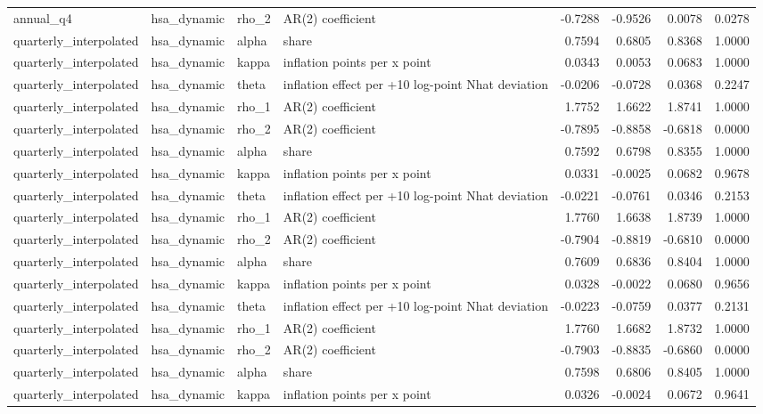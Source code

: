 \begin{tabular}{llllrrrr}
annual\_q4 & hsa\_dynamic & rho\_2 & AR(2) coefficient & -0.7288 & -0.9526 & 0.0078 & 0.0278 \\
quarterly\_interpolated & hsa\_dynamic & alpha & share & 0.7594 & 0.6805 & 0.8368 & 1.0000 \\
quarterly\_interpolated & hsa\_dynamic & kappa & inflation points per x point & 0.0343 & 0.0053 & 0.0683 & 1.0000 \\
quarterly\_interpolated & hsa\_dynamic & theta & inflation effect per +10 log-point Nhat deviation & -0.0206 & -0.0728 & 0.0368 & 0.2247 \\
quarterly\_interpolated & hsa\_dynamic & rho\_1 & AR(2) coefficient & 1.7752 & 1.6622 & 1.8741 & 1.0000 \\
quarterly\_interpolated & hsa\_dynamic & rho\_2 & AR(2) coefficient & -0.7895 & -0.8858 & -0.6818 & 0.0000 \\
quarterly\_interpolated & hsa\_dynamic & alpha & share & 0.7592 & 0.6798 & 0.8355 & 1.0000 \\
quarterly\_interpolated & hsa\_dynamic & kappa & inflation points per x point & 0.0331 & -0.0025 & 0.0682 & 0.9678 \\
quarterly\_interpolated & hsa\_dynamic & theta & inflation effect per +10 log-point Nhat deviation & -0.0221 & -0.0761 & 0.0346 & 0.2153 \\
quarterly\_interpolated & hsa\_dynamic & rho\_1 & AR(2) coefficient & 1.7760 & 1.6638 & 1.8739 & 1.0000 \\
quarterly\_interpolated & hsa\_dynamic & rho\_2 & AR(2) coefficient & -0.7904 & -0.8819 & -0.6810 & 0.0000 \\
quarterly\_interpolated & hsa\_dynamic & alpha & share & 0.7609 & 0.6836 & 0.8404 & 1.0000 \\
quarterly\_interpolated & hsa\_dynamic & kappa & inflation points per x point & 0.0328 & -0.0022 & 0.0680 & 0.9656 \\
quarterly\_interpolated & hsa\_dynamic & theta & inflation effect per +10 log-point Nhat deviation & -0.0223 & -0.0759 & 0.0377 & 0.2131 \\
quarterly\_interpolated & hsa\_dynamic & rho\_1 & AR(2) coefficient & 1.7760 & 1.6682 & 1.8732 & 1.0000 \\
quarterly\_interpolated & hsa\_dynamic & rho\_2 & AR(2) coefficient & -0.7903 & -0.8835 & -0.6860 & 0.0000 \\
quarterly\_interpolated & hsa\_dynamic & alpha & share & 0.7598 & 0.6806 & 0.8405 & 1.0000 \\
quarterly\_interpolated & hsa\_dynamic & kappa & inflation points per x point & 0.0326 & -0.0024 & 0.0672 & 0.9641 \\

\end{tabular}
